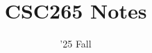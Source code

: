 \documentclass[11pt]{scrartcl}
\begin{document}
\title{CSC265 Notes}
\date{'25 Fall} %
\maketitle

\setcounter{tocdepth}{1}
\tableofcontents
\newpage

 \newpage
 \newpage
 \newpage
 \newpage
 \newpage

\end{document}
